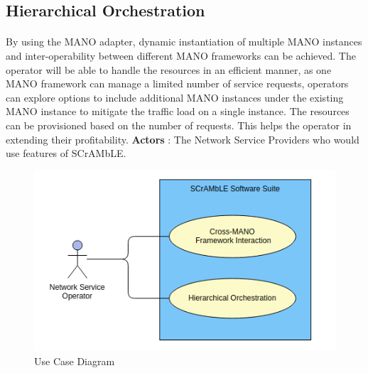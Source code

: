 \subsection{Hierarchical Orchestration}
\paragraph{}
By using the MANO adapter, dynamic instantiation of multiple MANO instances and inter-operability between different MANO frameworks can be achieved. The operator will be able to handle the resources in an efficient manner, as one MANO framework can manage a limited number of service requests, operators can explore options to include additional MANO instances under the existing MANO instance to mitigate the traffic load on a single instance. The resources can be provisioned based on the number of requests. This helps the operator in extending their profitability.
\newpage
\textbf{Actors} : The Network Service Providers who would use features of SCrAMbLE.

\begin{figure} [h]
	\centering
	\includegraphics[width=1.0\linewidth]{figures/use-case}
	\caption{Use Case Diagram}
	\label{fig:use-case}
\end{figure}





